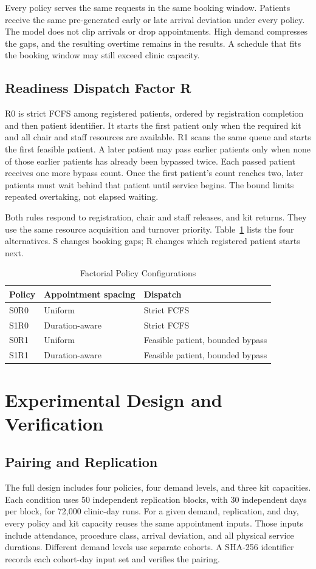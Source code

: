 \documentclass[conference]{IEEEtran}
\begin{document}
Every policy serves the same requests in the same booking window. Patients receive the same pre-generated early or late arrival deviation under every policy. The model does not clip arrivals or drop appointments. High demand compresses the gaps, and the resulting overtime remains in the results. A schedule that fits the booking window may still exceed clinic capacity.

\subsection{Readiness Dispatch Factor R}
R0 is strict FCFS among registered patients, ordered by registration completion and then patient identifier. It starts the first patient only when the required kit and all chair and staff resources are available. R1 scans the same queue and starts the first feasible patient. A later patient may pass earlier patients only when none of those earlier patients has already been bypassed twice. Each passed patient receives one more bypass count. Once the first patient's count reaches two, later patients must wait behind that patient until service begins. The bound limits repeated overtaking, not elapsed waiting.

Both rules respond to registration, chair and staff releases, and kit returns. They use the same resource acquisition and turnover priority. Table~\ref{tab:policies} lists the four alternatives. S changes booking gaps; R changes which registered patient starts next.

\begin{table}[t]
\caption{Factorial Policy Configurations}
\label{tab:policies}
\centering\footnotesize
\begin{tabular}{@{}lll@{}}
\toprule
Policy & Appointment spacing & Dispatch \\
\midrule
S0R0 & Uniform & Strict FCFS \\
S1R0 & Duration-aware & Strict FCFS \\
S0R1 & Uniform & Feasible patient, bounded bypass \\
S1R1 & Duration-aware & Feasible patient, bounded bypass \\
\bottomrule
\end{tabular}
\end{table}

\section{Experimental Design and Verification}
\subsection{Pairing and Replication}
The full design includes four policies, four demand levels, and three kit capacities. Each condition uses 50 independent replication blocks, with 30 independent days per block, for 72,000 clinic-day runs. For a given demand, replication, and day, every policy and kit capacity reuses the same appointment inputs. Those inputs include attendance, procedure class, arrival deviation, and all physical service durations. Different demand levels use separate cohorts. A SHA-256 identifier records each cohort-day input set and verifies the pairing.
\end{document}
